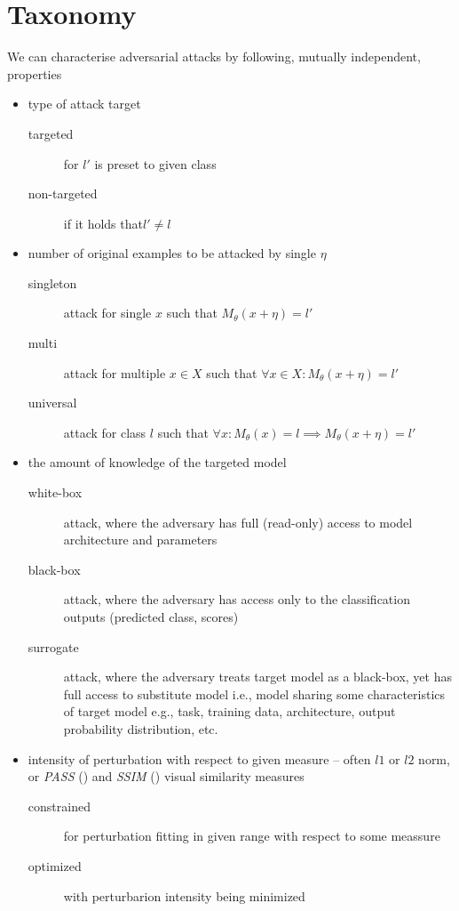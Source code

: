 \section{Taxonomy}
We can characterise adversarial attacks by following, mutually independent, properties
\begin{itemize}
\item type of attack target
    \begin{description}
    \item[targeted] for $l'$ is preset to given class
    \item[non-targeted] if it holds that$l' \neq l$
    \end{description}
\item number of original examples to be attacked by single $\eta$
    \begin{description}
    \item[singleton] attack for single $x$ such that $M_\theta(x + \eta) = l'$
    \item[multi] attack for multiple $x \in X$ such that $\forall x \in X: M_\theta(x + \eta) = l'$
    \item[universal] attack for class $l$ such that $\forall x: M_\theta(x) = l \implies M_\theta(x + \eta) = l'$
    \end{description}
\item the amount of knowledge of the targeted model
    \begin{description}
    \item[white-box] attack, where the adversary has full (read-only) access to model architecture and parameters
    \item[black-box] attack, where the adversary has access only to the classification outputs (predicted class, scores)
    \item[surrogate] attack, where the adversary treats target model as a black-box, yet has full access to substitute model i.e., model sharing some characteristics of target model e.g., task, training data, architecture, output probability distribution, etc.
    \end{description}
\item intensity of perturbation with respect to given measure -- often $l1$ or $l2$ norm, or \textit{PASS} (\cite{DBLP:journals/corr/RozsaRB16}) and \textit{SSIM} (\cite{ssim}) visual similarity measures
    \begin{description}
    \item[constrained] for perturbation fitting in given range with respect to some meassure 
    \item[optimized] with perturbarion intensity being minimized
    \end{description}
\end{itemize}

